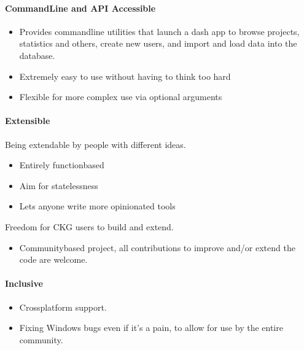 \documentclass[letterpaper,10pt,english]{sphinxmanual}
\begin{document}
\paragraph{Command\sphinxhyphen{}Line and API Accessible}
\label{\detokenize{MANIFEST:command-line-and-api-accessible}}\begin{itemize}
\item {} 
Provides command\sphinxhyphen{}line utilities that launch a dash app to browse projects, statistics and others, create new users, and import and load data into the database.

\item {} 
Extremely easy to use without having to think too hard

\item {} 
Flexible for more complex use via optional arguments

\end{itemize}


\paragraph{Extensible}
\label{\detokenize{MANIFEST:extensible}}
Being extendable by people with different ideas.
\begin{itemize}
\item {} 
Entirely function\sphinxhyphen{}based

\item {} 
Aim for statelessness

\item {} 
Lets anyone write more opinionated tools

\end{itemize}

Freedom for CKG users to build and extend.
\begin{itemize}
\item {} 
Community\sphinxhyphen{}based project, all contributions to improve and/or extend the code are welcome.

\end{itemize}


\paragraph{Inclusive}
\label{\detokenize{MANIFEST:inclusive}}\begin{itemize}
\item {} 
Cross\sphinxhyphen{}platform support.

\item {} 
Fixing Windows bugs even if it’s a pain, to allow for use by the entire community.

\end{itemize}
\end{document}
